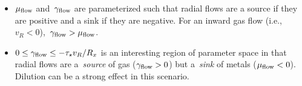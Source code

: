 \begin{itemize}

	\item $\mu_{\text{flow}}$ and~$\gamma_{\text{flow}}$ are parameterized such that radial
	flows are a source if they are positive and a sink if they are negative.
	For an inward gas flow (i.e.,~$v_R < 0$),~$\gamma_{\text{flow}} > \mu_{\text{flow}}$.

	\item $0 \leq \gamma_{\text{flow}} \leq -\tau_\star v_R / R_x$ is an interesting
	region of parameter space in that radial flows are a~\textit{source} of
	gas ($\gamma_{\text{flow}} > 0$) but a~\textit{sink} of metals ($\mu_{\text{flow}} < 0$).
	Dilution can be a strong effect in this scenario.

	

\end{itemize}



